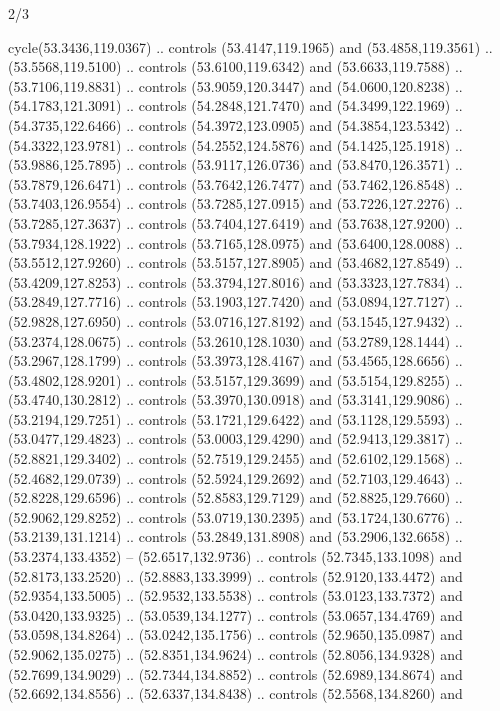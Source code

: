\begin{flagdescription}{2/3}
\begin{scope}[shift={(0.5\flaglength,0.5)},scale=\flagwidth/320]
\begin{scope}[y=0.8pt, x=0.8pt, yscale=-1,shift={(-118.3,-146)}]
  cycle(53.3436,119.0367) .. controls (53.4147,119.1965) and (53.4858,119.3561)
  .. (53.5568,119.5100) .. controls (53.6100,119.6342) and (53.6633,119.7588) ..
  (53.7106,119.8831) .. controls (53.9059,120.3447) and (54.0600,120.8238) ..
  (54.1783,121.3091) .. controls (54.2848,121.7470) and (54.3499,122.1969) ..
  (54.3735,122.6466) .. controls (54.3972,123.0905) and (54.3854,123.5342) ..
  (54.3322,123.9781) .. controls (54.2552,124.5876) and (54.1425,125.1918) ..
  (53.9886,125.7895) .. controls (53.9117,126.0736) and (53.8470,126.3571) ..
  (53.7879,126.6471) .. controls (53.7642,126.7477) and (53.7462,126.8548) ..
  (53.7403,126.9554) .. controls (53.7285,127.0915) and (53.7226,127.2276) ..
  (53.7285,127.3637) .. controls (53.7404,127.6419) and (53.7638,127.9200) ..
  (53.7934,128.1922) .. controls (53.7165,128.0975) and (53.6400,128.0088) ..
  (53.5512,127.9260) .. controls (53.5157,127.8905) and (53.4682,127.8549) ..
  (53.4209,127.8253) .. controls (53.3794,127.8016) and (53.3323,127.7834) ..
  (53.2849,127.7716) .. controls (53.1903,127.7420) and (53.0894,127.7127) ..
  (52.9828,127.6950) .. controls (53.0716,127.8192) and (53.1545,127.9432) ..
  (53.2374,128.0675) .. controls (53.2610,128.1030) and (53.2789,128.1444) ..
  (53.2967,128.1799) .. controls (53.3973,128.4167) and (53.4565,128.6656) ..
  (53.4802,128.9201) .. controls (53.5157,129.3699) and (53.5154,129.8255) ..
  (53.4740,130.2812) .. controls (53.3970,130.0918) and (53.3141,129.9086) ..
  (53.2194,129.7251) .. controls (53.1721,129.6422) and (53.1128,129.5593) ..
  (53.0477,129.4823) .. controls (53.0003,129.4290) and (52.9413,129.3817) ..
  (52.8821,129.3402) .. controls (52.7519,129.2455) and (52.6102,129.1568) ..
  (52.4682,129.0739) .. controls (52.5924,129.2692) and (52.7103,129.4643) ..
  (52.8228,129.6596) .. controls (52.8583,129.7129) and (52.8825,129.7660) ..
  (52.9062,129.8252) .. controls (53.0719,130.2395) and (53.1724,130.6776) ..
  (53.2139,131.1214) .. controls (53.2849,131.8908) and (53.2906,132.6658) ..
  (53.2374,133.4352) -- (52.6517,132.9736) .. controls (52.7345,133.1098) and
  (52.8173,133.2520) .. (52.8883,133.3999) .. controls (52.9120,133.4472) and
  (52.9354,133.5005) .. (52.9532,133.5538) .. controls (53.0123,133.7372) and
  (53.0420,133.9325) .. (53.0539,134.1277) .. controls (53.0657,134.4769) and
  (53.0598,134.8264) .. (53.0242,135.1756) .. controls (52.9650,135.0987) and
  (52.9062,135.0275) .. (52.8351,134.9624) .. controls (52.8056,134.9328) and
  (52.7699,134.9029) .. (52.7344,134.8852) .. controls (52.6989,134.8674) and
  (52.6692,134.8556) .. (52.6337,134.8438) .. controls (52.5568,134.8260) and

\end{scope}
\end{scope}
\end{flagdescription}

